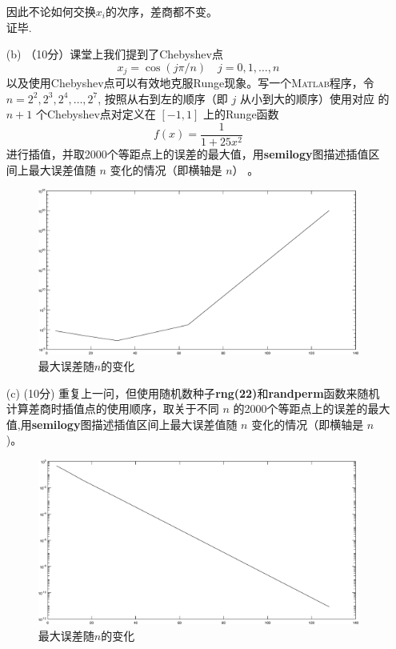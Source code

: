 \documentclass[12pt,a4paper,utf8]{ctexart}
\begin{document}
\begin{enumerate}
		因此不论如何交换$x_{i}$的次序，差商都不变。\\
		证毕.
		\item[(b)]（10分）课堂上我们提到了Chebyshev点
		$$
		x_{j}=\cos (j \pi / n) \quad j=0,1, \ldots, n
		$$
		以及使用Chebyshev点可以有效地克服Runge现象。写一个\textsc{Matlab}程序，令
		$n=2^{2}, 2^{3}, 2^{4}, \ldots, 2^{7}$, 按照从右到左的顺序（即 $j$ 从小到大的顺序）使用对应 的 $n+1$ 个Chebyshev点对定义在 $[-1,1]$ 上的Runge函数
		$$
		f(x)=\frac{1}{1+25 x^{2}}
		$$
		进行插值，并取2000个等距点上的误差的最大值，用\textbf{semilogy}图描述插值区间上最大误差值随 $n$ 变化的情况（即横轴是 $n$） 。
		\begin{figure}[H]
			\centering
			\includegraphics[width=\textwidth]{2semilogy1}
			\caption{最大误差随$n$的变化}  
			\label{5}  
		\end{figure} 

		\item[(c)](10分) 重复上一问，但使用随机数种子\textbf{rng(22)}和\textbf{randperm}函数来随机计算差商时插值点的使用顺序，取关于不同 $n$ 的2000个等距点上的误差的最大值,用\textbf{semilogy}图描述插值区间上最大误差值随 $n$ 变化的情况（即横轴是 $n$ )。
		\begin{figure}[H]
			\centering
			\includegraphics[width=\textwidth]{2semilogy2}
			\caption{最大误差随$n$的变化}  
			\label{6}  
		\end{figure} 		
		

\end{enumerate}
\end{document}
